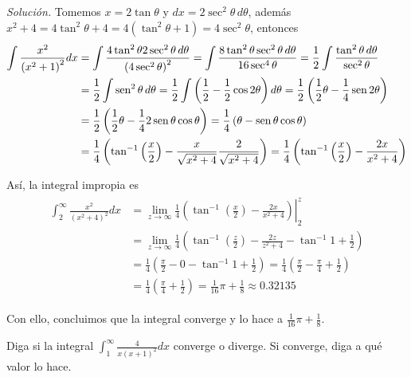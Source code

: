 \emph{Solución.} Tomemos $x=2\tan \theta$ y $dx=2\sec ^{2}\theta\,d\theta$, además $x^{2}+4=4\tan^{2}\theta +4=4\left( \tan ^{2}\theta +1\right) =4\sec ^{2}\theta $, entonces
\begin{gather*}
  \begin{aligned}
    \int \frac{x^{2}}{\left( x^{2}+1\right) ^{2}}dx&=\int \frac{4\tan ^{2}\theta 2\sec ^{2}\theta\,d\theta }{\left( 4\sec ^{2}\theta \right) ^{2}}=\int\frac{8\tan ^{2}\theta \sec ^{2}\theta\,d\theta }{16\sec ^{4}\theta }=\frac{1}{2}\int \frac{\tan ^{2}\theta\,d\theta }{\sec ^{2}\theta }\\
    &=\frac{1}{2}\int\sen ^{2}\theta\,d\theta=\frac{1}{2}\int \left( \frac{1}{2}-\frac{1}{2}\cos2\theta \right) d\theta
    =\frac{1}{2}\left( \frac{1}{2}\theta -\frac{1}{4}\sen 2\theta \right)\\
    &=\frac{1}{2}\left( \frac{1}{2}\theta -\frac{1}{4}2\sen \theta \cos \theta
    \right) =\frac{1}{4}\left( \theta -\sen \theta \cos \theta \right)\\
    &=\frac{1}{4}\left( \tan^{-1} \left( \frac{x}{2}\right) -\frac{x}{\sqrt{x^{2}+4%
    }}\frac{2}{\sqrt{x^{2}+4}}\right) =\frac{1}{4}\left( \tan^{-1} \left( \frac{x}{2}\right) -\frac{2x}{x^{2}+4}\right)
  \end{aligned}
\end{gather*}

Así, la integral impropia es
\begin{gather*}
  \begin{align*}
    \int_{2}^{\infty }\frac{x^{2}}{\left( x^{2}+4\right) ^{2}}dx&=\lim_{z\rightarrow \infty }\left.\frac{1}{4}\left( \tan^{-1} \left( \frac{x}{2}\right) -\frac{2x}{x^{2}+4}\right)\right\vert_{2}^{z}\\
    &=\lim_{z\rightarrow \infty }\frac{1}{4}\left( \tan^{-1} \left( \frac{z}{2}%
    \right) -\frac{2z}{z^{2}+4}-\tan^{-1} 1+\frac{1}{2}\right)\\
    &=\frac{1}{4}\left(\frac{\pi }{2}-0-\tan^{-1} 1+\frac{1}{2}\right) =\frac{1}{4}\left( \frac{\pi }{2}-\frac{\pi }{4}+\frac{1}{2}\right)\\ &=\frac{1}{4}\left( \frac{\pi }{4}+\frac{1}{2}\right)=\frac{1}{16}\pi +\frac{1}{8}\approx0.32135
  \end{align*}
\end{gather*}

Con ello, concluimos que la integral converge y lo hace a $\frac{1}{16}\pi +\frac{1}{8}$.

\begin{ejemplo}
  Diga si la integral $\int_{1}^{\infty }\frac{4}{x\left( x+1\right) ^{2}}dx$ converge o diverge. Si converge, diga a qué valor lo hace.
\end{ejemplo}

